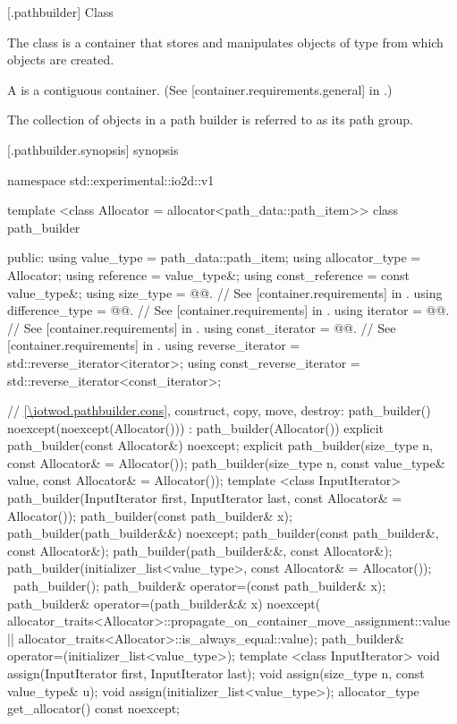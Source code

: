  [\iotwod.pathbuilder] {Class }

\pnum
{}%
The class  is a container that stores and manipulates objects of type  from which  objects are created.

\pnum
A  is a contiguous container. (See [container.requirements.general] in \cppseventeen.)

\pnum
The collection of  objects in a path builder is referred to as its path group.

 [\iotwod.pathbuilder.synopsis] { synopsis}%

\begin{codeblock}
namespace std::experimental::io2d::v1 {
  template <class Allocator = allocator<path_data::path_item>>
  class path_builder {
  public:
    using value_type = path_data::path_item;
    using allocator_type = Allocator;
    using reference = value_type&;
    using const_reference = const value_type&;
    using size_type       = @@. // See [container.requirements] in \cppseventeen.
    using difference_type = @@. // See [container.requirements] in \cppseventeen.
    using iterator       = @@. // See [container.requirements] in \cppseventeen.
    using const_iterator = @@. // See [container.requirements] in \cppseventeen.
    using reverse_iterator       = std::reverse_iterator<iterator>;
    using const_reverse_iterator = std::reverse_iterator<const_iterator>;
    
    // \ref{\iotwod.pathbuilder.cons}, construct, copy, move, destroy:
    path_builder() noexcept(noexcept(Allocator())) :
      path_builder(Allocator()) { }
    explicit path_builder(const Allocator&) noexcept;
    explicit path_builder(size_type n, const Allocator& = Allocator());
    path_builder(size_type n, const value_type& value,
      const Allocator& = Allocator());
    template <class InputIterator>
    path_builder(InputIterator first, InputIterator last,
      const Allocator& = Allocator());
    path_builder(const path_builder& x);
    path_builder(path_builder&&) noexcept;
    path_builder(const path_builder&, const Allocator&);
    path_builder(path_builder&&, const Allocator&);
    path_builder(initializer_list<value_type>, const Allocator& = Allocator());
    ~path_builder();
    path_builder& operator=(const path_builder& x);
    path_builder& operator=(path_builder&& x)
      noexcept(
      allocator_traits<Allocator>::propagate_on_container_move_assignment::value
      ||
      allocator_traits<Allocator>::is_always_equal::value);
    path_builder& operator=(initializer_list<value_type>);
    template <class InputIterator>
    void assign(InputIterator first, InputIterator last);
    void assign(size_type n, const value_type& u);
    void assign(initializer_list<value_type>);
    allocator_type get_allocator() const noexcept;
    
}}
\end{codeblock}
